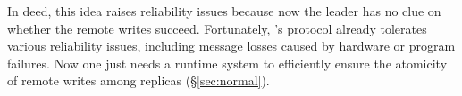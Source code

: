 
In deed, this idea raises reliability issues because now the leader has no clue
on whether the remote writes succeed. Fortunately, \paxos's protocol already
tolerates various reliability issues, including message losses caused by
hardware or program failures. Now one just needs a runtime system to efficiently
ensure the atomicity of remote writes among replicas (\S\ref{sec:normal}).






